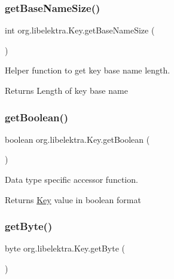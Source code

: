 \subsubsection{\texorpdfstring{get\+Base\+Name\+Size()}{getBaseNameSize()}}
{\footnotesize\ttfamily int org.\+libelektra.\+Key.\+get\+Base\+Name\+Size (\begin{DoxyParamCaption}{ }\end{DoxyParamCaption})\hspace{0.3cm}{\ttfamily [inline]}}



Helper function to get key base name length. 

\begin{DoxyReturn}{Returns}
Length of key base name 
\end{DoxyReturn}
\mbox{\label{classorg_1_1libelektra_1_1Key_a9841edcf6c48799c77d8db3b82189abc}} 
\subsubsection{\texorpdfstring{get\+Boolean()}{getBoolean()}}
{\footnotesize\ttfamily boolean org.\+libelektra.\+Key.\+get\+Boolean (\begin{DoxyParamCaption}{ }\end{DoxyParamCaption})\hspace{0.3cm}{\ttfamily [inline]}}



Data type specific accessor function. 

\begin{DoxyReturn}{Returns}
\hyperlink{classorg_1_1libelektra_1_1Key}{Key} value in boolean format 
\end{DoxyReturn}
\mbox{\label{classorg_1_1libelektra_1_1Key_ad29faef52eb7ceb2940d4960a5717b5c}} 
\subsubsection{\texorpdfstring{get\+Byte()}{getByte()}}
{\footnotesize\ttfamily byte org.\+libelektra.\+Key.\+get\+Byte (\begin{DoxyParamCaption}{ }\end{DoxyParamCaption})\hspace{0.3cm}{\ttfamily [inline]}}



